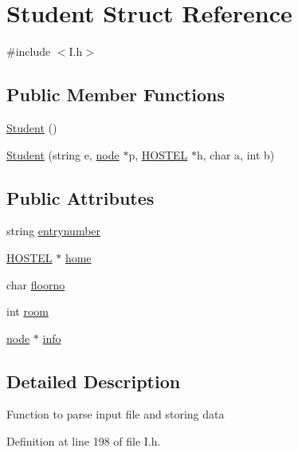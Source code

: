 \hypertarget{structStudent}{\section{\-Student \-Struct \-Reference}
\label{structStudent}
}


{\ttfamily \#include $<$\-I.\-h$>$}

\subsection*{\-Public \-Member \-Functions}
\begin{DoxyCompactItemize}
\item 
\hyperlink{structStudent_af9168cedbfa5565cf0b20c1a9d3f5c9d}{\-Student} ()
\item 
\hyperlink{structStudent_a2d071c296d89c78f0c7b256d7e0779b4}{\-Student} (string e, \hyperlink{structnode}{node} $\ast$p, \hyperlink{structHOSTEL}{\-H\-O\-S\-T\-E\-L} $\ast$h, char a, int b)
\end{DoxyCompactItemize}
\subsection*{\-Public \-Attributes}
\begin{DoxyCompactItemize}
\item 
string \hyperlink{structStudent_a2fa147d867b44e9692e2fc807a6b8ba2}{entrynumber}
\item 
\hyperlink{structHOSTEL}{\-H\-O\-S\-T\-E\-L} $\ast$ \hyperlink{structStudent_a5120bee9c5391fa9b102211d466f6541}{home}
\item 
char \hyperlink{structStudent_a48518eca5f8dc260e219e97116a9afa4}{floorno}
\item 
int \hyperlink{structStudent_abd1d6b3e6952e3fdabe131b635308344}{room}
\item 
\hyperlink{structnode}{node} $\ast$ \hyperlink{structStudent_a50be18920d1298fedf179c0caa49f0d6}{info}
\end{DoxyCompactItemize}


\subsection{\-Detailed \-Description}
\-Function to parse input file and storing data 

\-Definition at line 198 of file \-I.\-h.



